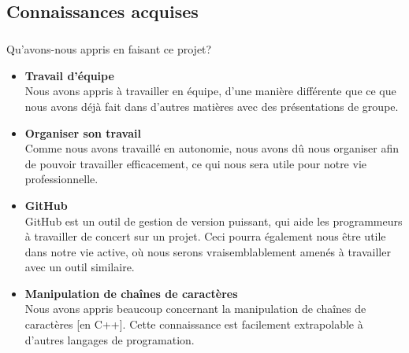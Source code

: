 \documentclass[12pt,a4paper,twoside]{article}
\begin{document}
		\subsection{Connaissances acquises} %
			\subparagraph*{}
				Qu'avons-nous appris en faisant ce projet?
				\begin{itemize}
					\item{} \textbf{Travail d'équipe}\\
						Nous avons appris à travailler en équipe, d'une manière différente que ce que nous avons déjà fait dans d'autres matières avec des présentations de groupe.
					\item{} \textbf{Organiser son travail}\\
						Comme nous avons travaillé en autonomie, nous avons dû nous organiser afin de pouvoir travailler efficacement, ce qui nous sera utile pour notre vie professionnelle.
					\item{} \textbf{GitHub}\\
						GitHub est un outil de gestion de version puissant, qui aide les programmeurs à travailler de concert sur un projet. Ceci pourra également nous être utile dans notre vie active, où nous serons vraisemblablement amenés à travailler avec un outil similaire.
					\item{} \textbf{Manipulation de chaînes de caractères}\\
						Nous avons appris beaucoup concernant la manipulation de chaînes de caractères [en C++]. Cette connaissance est facilement extrapolable à d'autres langages de programation.
				\end{itemize}
\end{document}
